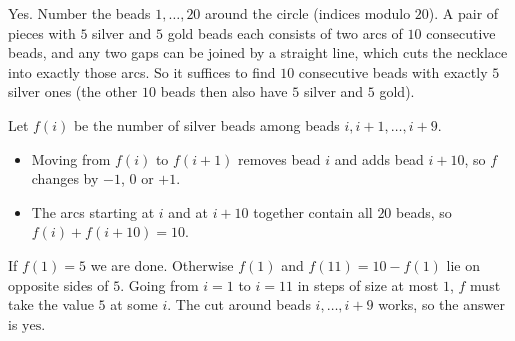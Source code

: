 Yes. Number the beads $1,\dots,20$ around the circle (indices modulo $20$). A pair of pieces with $5$ silver and $5$ gold beads each consists of two arcs of $10$ consecutive beads, and any two gaps can be joined by a straight line, which cuts the necklace into exactly those arcs. So it suffices to find $10$ consecutive beads with exactly $5$ silver ones (the other $10$ beads then also have $5$ silver and $5$ gold).

Let $f(i)$ be the number of silver beads among beads $i,i+1,\dots,i+9$.
\begin{itemize}
\item Moving from $f(i)$ to $f(i+1)$ removes bead $i$ and adds bead $i+10$, so $f$ changes by $-1$, $0$ or $+1$.
\item The arcs starting at $i$ and at $i+10$ together contain all $20$ beads, so $f(i)+f(i+10)=10$.
\end{itemize}
If $f(1)=5$ we are done. Otherwise $f(1)$ and $f(11)=10-f(1)$ lie on opposite sides of $5$. Going from $i=1$ to $i=11$ in steps of size at most $1$, $f$ must take the value $5$ at some $i$. The cut around beads $i,\dots,i+9$ works, so the answer is $\boxed{\text{yes}}$.
